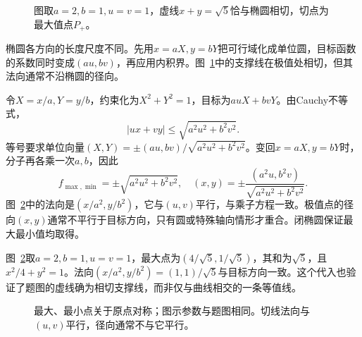 \begin{figure}[H]\centering
{}
\caption{图取$a=2,b=1,u=v=1$，虚线$x+y=\sqrt5$恰与椭圆相切，切点为最大值点$P_+$。}\label{fig:c3-h5-q}
\end{figure}
\begin{solution}
椭圆各方向的长度尺度不同。先用$x=aX,y=bY$把可行域化成单位圆，目标函数的系数同时变成$(au,bv)$，再应用内积界。图~\ref{fig:c3-h5-q}中的支撑线在极值处相切，但其法向通常不沿椭圆的径向。


令$X=x/a,Y=y/b$，约束化为$X^2+Y^2=1$，目标为$auX+bvY$。由Cauchy不等式，
\[|ux+vy|\le\sqrt{a^2u^2+b^2v^2}.
\]
等号要求单位向量$(X,Y)=\pm(au,bv)/\sqrt{a^2u^2+b^2v^2}$。变回$x=aX,y=bY$时，分子再各乘一次$a,b$，因此
\[\boxed{f_{\max,\min}=\pm\sqrt{a^2u^2+b^2v^2},\quad
(x,y)=\pm\frac{(a^2u,b^2v)}{\sqrt{a^2u^2+b^2v^2}}}.\]
图~\ref{fig:c3-h5-s}中的法向是$(x/a^2,y/b^2)$，它与$(u,v)$平行，与乘子方程一致。极值点的径向$(x,y)$通常不平行于目标方向，只有圆或特殊轴向情形才重合。闭椭圆保证最大最小值均取得。



图~\ref{fig:c3-h5-s}取$a=2,b=1,u=v=1$，最大点为$(4/\sqrt5,1/\sqrt5)$，其和为$\sqrt5$，且$x^2/4+y^2=1$。法向$(x/a^2,y/b^2)=(1,1)/\sqrt5$与目标方向一致。这个代入也验证了题图的虚线确为相切支撑线，而非仅与曲线相交的一条等值线。

\begin{figure}[H]\centering
{}
\caption{最大、最小点关于原点对称；图示参数与题图相同。切线法向与$(u,v)$平行，径向通常不与它平行。}\label{fig:c3-h5-s}
\end{figure}
\end{solution}

